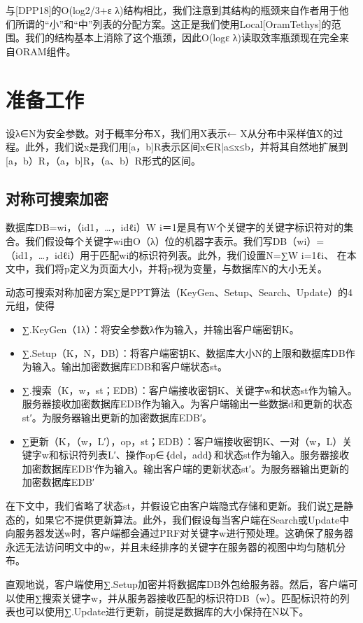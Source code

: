 \documentclass[UTF8]{article}
\begin{document}
与[DPP18]的O(log2/3+ε λ)结构相比，我们注意到其结构的瓶颈来自作者用于他们所谓的“小”和“中”列表的分配方案。这正是我们使用Local[OramTethys]的范围。我们的结构基本上消除了这个瓶颈，因此O(logε λ)读取效率瓶颈现在完全来自ORAM组件。
\section{准备工作}
设λ∈N为安全参数。对于概率分布X，我们用X表示← X从分布中采样值X的过程。此外，我们说x是我们用[a，b]R表示区间{x∈R|a≤x≤b}，并将其自然地扩展到[a，b）R，（a，b]R，（a、b）R形式的区间。
\subsection{对称可搜索加密}
数据库DB={wi，（id1，…，idℓi）}W i＝1是具有W个关键字的关键字标识符对的集合。我们假设每个关键字wi由O（λ）位的机器字表示。我们写DB（wi）=（id1，…，idℓi）用于匹配wi的标识符列表。此外，我们设置N=∑W i=1ℓi、 在本文中，我们将p定义为页面大小，并将p视为变量，与数据库N的大小无关。

动态可搜索对称加密方案∑是PPT算法（KeyGen、Setup、Search、Update）的4元组，使得

\begin{itemize}
  \item ∑.KeyGen（1λ）：将安全参数λ作为输入，并输出客户端密钥K。
  \item ∑.Setup（K，N，DB）：将客户端密钥K、数据库大小N的上限和数据库DB作为输入。输出加密数据库EDB和客户端状态st。
  \item ∑.搜索（K，w，st；EDB）：客户端接收密钥K、关键字w和状态st作为输入。服务器接收加密数据库EDB作为输入。为客户端输出一些数据d和更新的状态st′。为服务器输出更新的加密数据库EDB′。
  \item ∑更新（K，（w，L′），op，st；EDB）：客户端接收密钥K、一对（w，L）关键字w和标识符列表L′、操作op∈｛del，add｝和状态st作为输入。服务器接收加密数据库EDB′作为输入。输出客户端的更新状态st′。为服务器输出更新的加密数据库EDB′
\end{itemize}

在下文中，我们省略了状态st，并假设它由客户端隐式存储和更新。我们说∑是静态的，如果它不提供更新算法。此外，我们假设每当客户端在Search或Update中向服务器发送w时，客户端都会通过PRF对关键字w进行预处理。这确保了服务器永远无法访问明文中的w，并且未经排序的关键字在服务器的视图中均匀随机分布。

直观地说，客户端使用∑.Setup加密并将数据库DB外包给服务器。然后，客户端可以使用∑搜索关键字w，并从服务器接收匹配的标识符DB（w）。匹配标识符的列表也可以使用∑.Update进行更新，前提是数据库的大小保持在N以下。
\end{document}
